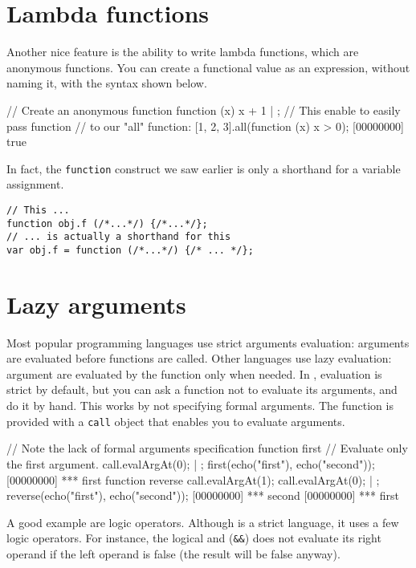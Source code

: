 \section{Lambda functions}

Another nice feature is the ability to write lambda functions, which
are anonymous functions. You can create a functional value as an
expression, without naming it, with the syntax shown below.

\begin{urbiscript}
// Create an anonymous function
function (x) {x + 1} | {};
// This enable to easily pass function
// to our "all" function:
[1, 2, 3].all(function (x) { x > 0});
[00000000] true
\end{urbiscript}

In fact, the \lstinline{function} construct we saw earlier is only a
shorthand for a variable assignment.

\begin{lstlisting}
// This ...
function obj.f (/*...*/) {/*...*/};
// ... is actually a shorthand for this
var obj.f = function (/*...*/) {/* ... */};
\end{lstlisting}

\section{Lazy arguments}

Most popular programming languages use strict arguments evaluation:
arguments are evaluated before functions are called. Other languages
use lazy evaluation: argument are evaluated by the function only when
needed. In \us, evaluation is strict by default, but you can ask a
function not to evaluate its arguments, and do it by hand. This works
by not specifying formal arguments. The function is provided with a
\lstinline{call} object that enables you to evaluate arguments.

\begin{urbiscript}
// Note the lack of formal arguments specification
function first
{
  // Evaluate only the first argument.
  call.evalArgAt(0);
} | {};
first(echo("first"), echo("second"));
[00000000] *** first
function reverse
{
  call.evalArgAt(1);
  call.evalArgAt(0);
} | {};
reverse(echo("first"), echo("second"));
[00000000] *** second
[00000000] *** first
\end{urbiscript}

A good example are logic operators. Although \Cxx is a strict
language, it uses a few logic operators. For instance, the logical and
(\lstinline{&&}) does not evaluate its right operand if the left
operand is false (the result will be false anyway).

